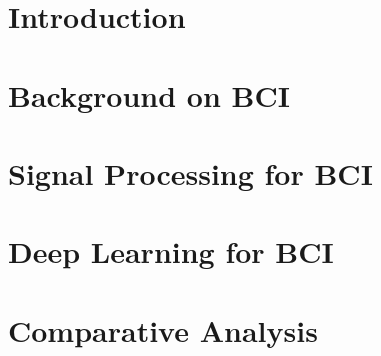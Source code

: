 \documentclass[harvard]{lincolncsuthesis}
\begin{document}
\maketitle

%






\thesisTables
\printnomenclature[3cm]
\setcounter{tocdepth}{4}
\setcounter{secnumdepth}{4}
\thesisBodyStart

\chapter{Introduction}


% 

\chapter{Background on BCI} \label{ch:background}


\chapter{Signal Processing for BCI} \label{ch:sp_bci}


\chapter{Deep Learning for BCI} \label{ch:DL_bci}


\chapter{Comparative Analysis} \label{ch:cmp_bnch}

\end{document}
